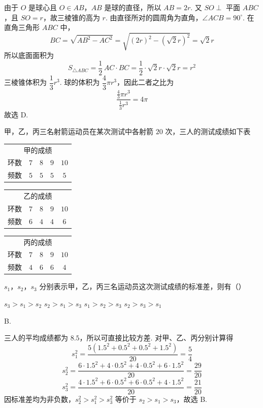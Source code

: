 \begin{solution}
由于 \(O\) 是球心且 \(O\in AB\)，\(AB\) 是球的直径，所以 \(AB=2r\). 又 \(SO\perp\) 平面 \(ABC\)，且 \(SO=r\)，故三棱锥的高为 \(r\). 由直径所对的圆周角为直角，\(\angle ACB=90^\circ\). 在直角三角形 \(ABC\) 中，
\[
BC=\sqrt{AB^2-AC^2}=\sqrt{(2r)^2-(\sqrt2r)^2}=\sqrt2r
\]
所以底面面积为
\[
S_{\triangle ABC}=\frac12\,AC\cdot BC=\frac12\cdot\sqrt2r\cdot\sqrt2r=r^2
\]
三棱锥体积为 \(\dfrac13r^3\). 球的体积为 \(\dfrac43\pi r^3\)，因此二者之比为
\[
\frac{\frac43\pi r^3}{\frac13r^3}=4\pi
\]
故选 D.
\end{solution}

\begin{problem}
甲，乙，丙三名射箭运动员在某次测试中各射箭 \(20\) 次，三人的测试成绩如下表

\begin{center}
\begin{tabular}{ccccc}
\multicolumn{5}{c}{甲的成绩} \\
环数 & \(7\) & \(8\) & \(9\) & \(10\) \\
频数 & \(5\) & \(5\) & \(5\) & \(5\)
\end{tabular}
\qquad
\begin{tabular}{ccccc}
\multicolumn{5}{c}{乙的成绩} \\
环数 & \(7\) & \(8\) & \(9\) & \(10\) \\
频数 & \(6\) & \(4\) & \(4\) & \(6\)
\end{tabular}
\qquad
\begin{tabular}{ccccc}
\multicolumn{5}{c}{丙的成绩} \\
环数 & \(7\) & \(8\) & \(9\) & \(10\) \\
频数 & \(4\) & \(6\) & \(6\) & \(4\)
\end{tabular}
\end{center}

\(s_{1}\)，\(s_{2}\)，\(s_{3}\) 分别表示甲，乙，丙三名运动员这次测试成绩的标准差，则有（\quad）

\choices
    {\( s_{3} > s_{1} > s_{2} \)}
    {\( s_{2} > s_{1} > s_{3} \)}
    {\( s_{1} > s_{2} > s_{3} \)}
    {\( s_{2} > s_{3} > s_{1} \)}
\end{problem}

\begin{answer}
B.
\end{answer}

\begin{solution}
三人的平均成绩都为 \(8.5\)，所以可直接比较方差. 对甲、乙、丙分别计算得
\[
s_1^2=\frac{5(1.5^2+0.5^2+0.5^2+1.5^2)}{20}=\frac54
\]
\[
s_2^2=\frac{6\cdot1.5^2+4\cdot0.5^2+4\cdot0.5^2+6\cdot1.5^2}{20}=\frac{29}{20}
\]
\[
s_3^2=\frac{4\cdot1.5^2+6\cdot0.5^2+6\cdot0.5^2+4\cdot1.5^2}{20}=\frac{21}{20}
\]
因标准差均为非负数，\(s_2^2>s_1^2>s_3^2\) 等价于 \(s_2>s_1>s_3\)，故选 B.
\end{solution}

